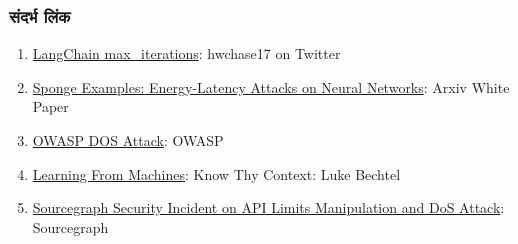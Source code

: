 \documentclass[
]{article}
\providecommand{\tightlist}{%
  \setlength{\itemsep}{0pt}\setlength{\parskip}{0pt}}
\begin{document}
\subsubsection{संदर्भ लिंक}\label{ux938ux926ux930ux92d-ux932ux915}

\begin{enumerate}
\def\labelenumi{\arabic{enumi}.}
\tightlist
\item
  \href{https://twitter.com/hwchase17/status/1608467493877579777}{LangChain
  max\_iterations}: hwchase17 on Twitter
\item
  \href{https://arxiv.org/abs/2006.03463}{Sponge Examples:
  Energy-Latency Attacks on Neural Networks}: Arxiv White Paper
\item
  \href{https://owasp.org/www-community/attacks/Denial_of_Service}{OWASP
  DOS Attack}: OWASP
\item
  \href{https://lukebechtel.com/blog/lfm-know-thy-context}{Learning From
  Machines}: Know Thy Context: Luke Bechtel
\item
  \href{https://about.sourcegraph.com/blog/security-update-august-2023}{Sourcegraph
  Security Incident on API Limits Manipulation and DoS Attack}:
  Sourcegraph
\end{enumerate}
\end{document}
